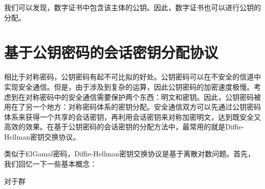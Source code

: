 我们可以发现，数字证书中包含该主体的公钥。因此，数字证书也可以进行公钥的分配。
\section{基于公钥密码的会话密钥分配协议}
相比于对称密码，公钥密码有起不可比拟的好处。公钥密码可以在不安全的信道中实现安全通信。但是，由于涉及到复杂的运算，因此公钥密码的加密速度极慢。考虑到在对称密码中的安全通信需要保护两个东西：明文和密钥。因此，公钥密码被用在了另一个地方：对称密码体系的密钥分配。安全通信双方可以先通过公钥密码体系来获得一个共享的会话密钥，再利用会话密钥来对称加密明文，达到既安全又高效的效果。在基于公钥密码的会话密钥的分配方法中，最常用的就是Diffie-Hellman密钥交换协议。\par
类似于ElGamal密码，Diffie-Hellman密钥交换协议是基于离散对数问题。首先，我们回忆一下一些基本概念：\par
对于群